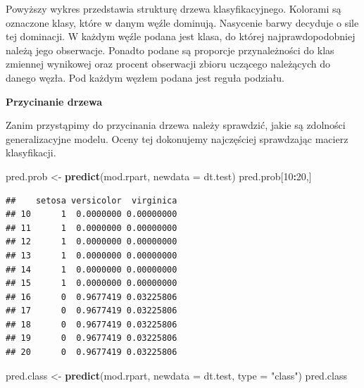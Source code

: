 \documentclass[
]{book}
\newenvironment{Shaded}{\begin{snugshade}}{\end{snugshade}}
\newcommand{\DataTypeTok}[1]{\textcolor[rgb]{0.13,0.29,0.53}{#1}}
\newcommand{\DecValTok}[1]{\textcolor[rgb]{0.00,0.00,0.81}{#1}}
\newcommand{\KeywordTok}[1]{\textcolor[rgb]{0.13,0.29,0.53}{\textbf{#1}}}
\newcommand{\NormalTok}[1]{#1}
\newcommand{\OperatorTok}[1]{\textcolor[rgb]{0.81,0.36,0.00}{\textbf{#1}}}
\newcommand{\StringTok}[1]{\textcolor[rgb]{0.31,0.60,0.02}{#1}}
\theoremstyle{plain}
\theoremstyle{definition}
\theoremstyle{definition}
\theoremstyle{definition}
\theoremstyle{definition}
\theoremstyle{remark}
\begin{document}
Powyższy wykres przedstawia strukturę drzewa klasyfikacyjnego. Kolorami są oznaczone klasy, które w danym węźle dominują. Nasycenie barwy decyduje o sile tej dominacji. W każdym węźle podana jest klasa, do której najprawdopodobniej należą jego obserwacje. Ponadto podane są proporcje przynależności do klas zmiennej wynikowej oraz procent obserwacji zbioru uczącego należących do danego węzła. Pod każdym węzłem podana jest reguła podziału.

\textbf{Przycinanie drzewa}

Zanim przystąpimy do przycinania drzewa należy sprawdzić, jakie są zdolności generalizacyjne modelu. Oceny tej dokonujemy najczęściej sprawdzając macierz klasyfikacji.

\begin{Shaded}
\begin{Highlighting}[]
\NormalTok{pred.prob <-}\StringTok{ }\KeywordTok{predict}\NormalTok{(mod.rpart, }
                     \DataTypeTok{newdata =}\NormalTok{ dt.test)}
\NormalTok{pred.prob[}\DecValTok{10}\OperatorTok{:}\DecValTok{20}\NormalTok{,]}
\end{Highlighting}
\end{Shaded}

\begin{verbatim}
##    setosa versicolor  virginica
## 10      1  0.0000000 0.00000000
## 11      1  0.0000000 0.00000000
## 12      1  0.0000000 0.00000000
## 13      1  0.0000000 0.00000000
## 14      1  0.0000000 0.00000000
## 15      1  0.0000000 0.00000000
## 16      0  0.9677419 0.03225806
## 17      0  0.9677419 0.03225806
## 18      0  0.9677419 0.03225806
## 19      0  0.9677419 0.03225806
## 20      0  0.9677419 0.03225806
\end{verbatim}

\begin{Shaded}
\begin{Highlighting}[]
\NormalTok{pred.class <-}\StringTok{ }\KeywordTok{predict}\NormalTok{(mod.rpart, }
                      \DataTypeTok{newdata =}\NormalTok{ dt.test,}
                      \DataTypeTok{type =} \StringTok{"class"}\NormalTok{)}
\NormalTok{pred.class}
\end{Highlighting}
\end{Shaded}
\end{document}
